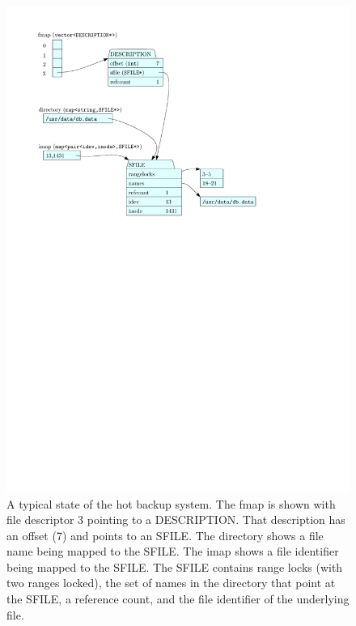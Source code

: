 \documentclass[10pt]{article}
\begin{document}
\begin{figure}
\begin{center}
\includegraphics{overview.pdf}
\end{center}
\caption{A typical state of the hot backup system.  The fmap is shown
  with file descriptor 3 pointing to a DESCRIPTION.  That description
  has an offset (7) and points to an SFILE.  The directory shows a
  file name being mapped to the SFILE.  The imap shows a file
  identifier being mapped to the SFILE.  The SFILE contains range
  locks (with two ranges locked), the set of names in the directory
  that point at the SFILE, a reference count, and the file identifier
  of the underlying file.}
\label{fig:overview}
\end{figure}
\end{document}
